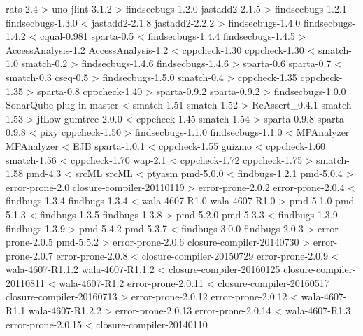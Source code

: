 rats-2.4 > uno
jlint-3.1.2 > findsecbugs-1.2.0
jastadd2-2.1.5 > findsecbugs-1.2.1
findsecbugs-1.3.0 < jastadd2-2.1.8
jastadd2-2.2.2 > findsecbugs-1.4.0
findsecbugs-1.4.2 < cqual-0.981
sparta-0.5 < findsecbugs-1.4.4
findsecbugs-1.4.5 > AccessAnalysis-1.2
AccessAnalysis-1.2 < cppcheck-1.30
cppcheck-1.30 < smatch-1.0
smatch-0.2 > findsecbugs-1.4.6
findsecbugs-1.4.6 > sparta-0.6
sparta-0.7 < smatch-0.3
cseq-0.5 > findsecbugs-1.5.0
smatch-0.4 > cppcheck-1.35
cppcheck-1.35 > sparta-0.8
cppcheck-1.40 > sparta-0.9.2
sparta-0.9.2 > findsecbugs-1.0.0
SonarQube-plug-in-master < smatch-1.51
smatch-1.52 > ReAssert\_0.4.1
smatch-1.53 > jfLow
gumtree-2.0.0 < cppcheck-1.45
smatch-1.54 > sparta-0.9.8
sparta-0.9.8 < pixy
cppcheck-1.50 > findsecbugs-1.1.0
findsecbugs-1.1.0 < MPAnalyzer
MPAnalyzer < EJB
sparta-1.0.1 < cppcheck-1.55
guizmo < cppcheck-1.60
smatch-1.56 < cppcheck-1.70
wap-2.1 < cppcheck-1.72
cppcheck-1.75 > smatch-1.58
pmd-4.3 < srcML
srcML < ptyasm
pmd-5.0.0 < findbugs-1.2.1
pmd-5.0.4 > error-prone-2.0
closure-compiler-20110119 > error-prone-2.0.2
error-prone-2.0.4 < findbugs-1.3.4
findbugs-1.3.4 < wala-4607-R1.0
wala-4607-R1.0 > pmd-5.1.0
pmd-5.1.3 < findbugs-1.3.5
findbugs-1.3.8 > pmd-5.2.0
pmd-5.3.3 < findbugs-1.3.9
findbugs-1.3.9 > pmd-5.4.2
pmd-5.3.7 < findbugs-3.0.0
findbugs-2.0.3 > error-prone-2.0.5
pmd-5.5.2 > error-prone-2.0.6
closure-compiler-20140730 > error-prone-2.0.7
error-prone-2.0.8 < closure-compiler-20150729
error-prone-2.0.9 < wala-4607-R1.1.2
wala-4607-R1.1.2 < closure-compiler-20160125
closure-compiler-20110811 < wala-4607-R1.2
error-prone-2.0.11 < closure-compiler-20160517
closure-compiler-20160713 > error-prone-2.0.12
error-prone-2.0.12 < wala-4607-R1.1
wala-4607-R1.2.2 > error-prone-2.0.13
error-prone-2.0.14 < wala-4607-R1.3
error-prone-2.0.15 < closure-compiler-20140110

